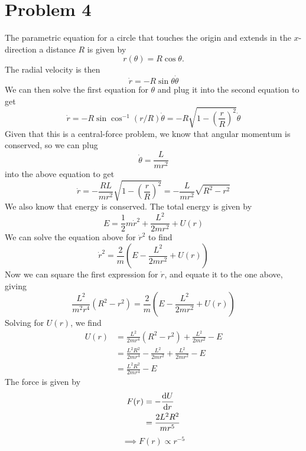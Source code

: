 \documentclass[12pt]{article}
\begin{document}
\section*{Problem 4}
The parametric equation for a circle that touches the origin and extends in the $x$-direction a distance $R$ is given by
\[ r(\theta) = R\cos\theta. \]
The radial velocity is then
\[ \dot{r} = -R\sin\theta\dot{\theta} \]
We can then solve the first equation for $\theta$ and plug it into the second equation to get
\[ \dot{r} = -R\sin\cos^{-1}(r/R)\dot{\theta} = -R\sqrt{1 - \left(\frac{r}{R}\right)^2}\dot{\theta} \]
Given that this is a central-force problem, we know that angular momentum is conserved, so we can plug
\[ \dot{\theta} = \frac{L}{mr^2} \]
into the above equation to get
\[ \dot{r} = -\frac{RL}{mr^2}\sqrt{1 - \left(\frac{r}{R}\right)^2} = -\frac{L}{mr^2}\sqrt{R^2 - r^2} \]
We also know that energy is conserved. The total energy is given by
\[ E = \frac{1}{2}m\dot{r}^2 + \frac{L^2}{2mr^2} + U(r) \]
We can solve the equation above for $\dot{r}^2$ to find
\[ \dot{r}^2 = \frac{2}{m}\left(E - \frac{L^2}{2mr^2} + U(r)\right) \]
Now we can square the first expression for $\dot{r}$, and equate it to the one above, giving
\[ \frac{L^2}{m^2r^4}\left(R^2 - r^2\right) = \frac{2}{m}\left(E - \frac{L^2}{2mr^2} + U(r)\right) \]
Solving for $U(r)$, we find
\begin{align*}
    U(r) &= \frac{L^2}{2mr^4}\left(R^2 - r^2\right) + \frac{L^2}{2mr^2} - E \\
    &= \frac{L^2R^2}{2mr^4} - \frac{L^2}{2mr^2} + \frac{L^2}{2mr^2} - E \\
    &= \frac{L^2R^2}{2mr^4} - E
\end{align*}
The force is given by
\begin{align*}
    F(r) &= -\dv{U}{r} \\
    &= \frac{2L^2R^2}{mr^5}
\end{align*}
\[ \implies \boxed{F(r) \propto r^{-5   }} \]
\end{document}
